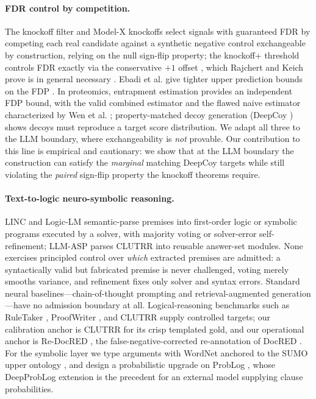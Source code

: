 \documentclass[11pt,letterpaper]{article}
\begin{document}
\paragraph{FDR control by competition.} The knockoff filter \cite{Barber2015} and Model-X knockoffs \cite{Cands2016} select signals with guaranteed FDR by competing each real candidate against a synthetic negative control exchangeable by construction, relying on the null sign-flip property; the knockoff+ threshold controls FDR exactly via the conservative $+1$ offset \cite{Barber2015}, which Rajchert and Keich prove is in general necessary \cite{Rajchert2022}. Ebadi et al. give tighter upper prediction bounds on the FDP \cite{Ebadi2023}. In proteomics, entrapment estimation provides an independent FDP bound, with the valid combined estimator and the flawed naive estimator characterized by Wen et al. \cite{Wen2024}; property-matched decoy generation (DeepCoy \cite{Imrie2020}) shows decoys must reproduce a target score distribution. We adapt all three to the LLM boundary, where exchangeability is \emph{not} provable. Our contribution to this line is empirical and cautionary: we show that at the LLM boundary the construction can satisfy the \emph{marginal} matching DeepCoy targets while still violating the \emph{paired} sign-flip property the knockoff theorems require.

\paragraph{Text-to-logic neuro-symbolic reasoning.} LINC \cite{Olausson2023} and Logic-LM \cite{Pan2023} semantic-parse premises into first-order logic or symbolic programs executed by a solver, with majority voting or solver-error self-refinement; LLM-ASP \cite{Yang2023} parses CLUTRR into reusable answer-set modules. None exercises principled control over \emph{which} extracted premises are admitted: a syntactically valid but fabricated premise is never challenged, voting merely smooths variance, and refinement fixes only solver and syntax errors. Standard neural baselines---chain-of-thought prompting \cite{Wei2022} and retrieval-augmented generation \cite{Lewis2020}---have no admission boundary at all. Logical-reasoning benchmarks such as RuleTaker \cite{Clark2020}, ProofWriter \cite{Tafjord2020}, and CLUTRR \cite{Sinha2019} supply controlled targets; our calibration anchor is CLUTRR for its crisp templated gold, and our operational anchor is Re-DocRED \cite{Tan2022}, the false-negative-corrected re-annotation of DocRED \cite{Yao2019}. For the symbolic layer we type arguments with WordNet \cite{Miller1995} anchored to the SUMO upper ontology \cite{Niles2001}, and design a probabilistic upgrade on ProbLog \cite{Raedt2007}, whose DeepProbLog extension \cite{Manhaeve2018} is the precedent for an external model supplying clause probabilities.
\end{document}
